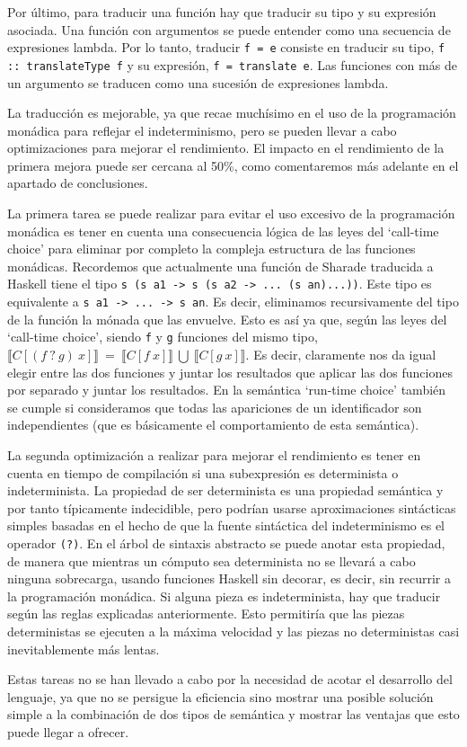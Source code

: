 \documentclass[class=article, crop=false]{standalone}
\begin{document}
Por último, para traducir una función hay que traducir su tipo y su expresión asociada.
Una función con argumentos se puede entender como una secuencia de expresiones lambda. Por
lo tanto, traducir \verb`f = e` consiste en traducir su tipo, \verb`f :: translateType f` y
su expresión, \verb`f = translate e`. Las funciones con más de un argumento se traducen como
una sucesión de expresiones lambda.

La traducción es mejorable, ya que recae muchísimo en el uso de la programación monádica
para reflejar el indeterminismo, pero se pueden llevar a cabo optimizaciones para mejorar
el rendimiento. El impacto en el rendimiento de la primera mejora puede ser cercana al 50\%,
como comentaremos más adelante en el apartado de conclusiones.

La primera tarea se puede realizar para evitar el uso excesivo de la programación monádica
es tener en cuenta una consecuencia lógica de las leyes del `call-time choice' para eliminar
por completo la compleja estructura de las funciones monádicas. Recordemos que actualmente
una función de Sharade traducida a Haskell tiene el tipo
\verb`s (s a1 -> s (s a2 -> ... (s an)...))`. Este tipo es equivalente a
\verb`s a1 -> ... -> s an`. Es decir, eliminamos recursivamente del tipo de la función la
mónada que las envuelve. Esto es así ya que, según las leyes del `call-time choice', siendo
\verb`f` y \verb`g` funciones del mismo tipo, $\llbracket C[(f \: ? \: g) \: x]\rrbracket
\: = \: \llbracket C[f \: x]\rrbracket \: \bigcup \: \llbracket C[g \: x]\rrbracket$. Es
decir, claramente nos da igual elegir entre las dos funciones y juntar los resultados que
aplicar las dos funciones por separado y juntar los resultados. En la semántica
`run-time choice' también se cumple si consideramos que todas las apariciones de un
identificador son  independientes (que es básicamente el comportamiento de esta semántica).

La segunda optimización a realizar para mejorar el rendimiento es tener en cuenta en tiempo
de compilación si una subexpresión es determinista o indeterminista. La propiedad de ser
determinista es una propiedad semántica y por tanto típicamente indecidible, pero podrían
usarse aproximaciones sintácticas simples basadas en el hecho de que la fuente sintáctica
del indeterminismo es el operador \verb`(?)`. En el árbol de sintaxis abstracto se puede
anotar esta propiedad, de manera que mientras un cómputo sea determinista no se llevará a
cabo ninguna sobrecarga, usando funciones Haskell sin decorar, es decir, sin recurrir a la
programación monádica. Si alguna pieza es indeterminista, hay que traducir según las reglas
explicadas anteriormente. Esto permitiría que las piezas deterministas se ejecuten a la
máxima velocidad y las piezas no deterministas casi inevitablemente más lentas.

Estas tareas no se han llevado a cabo por la necesidad de acotar el desarrollo del lenguaje,
ya que no se persigue la eficiencia sino mostrar una posible solución simple a la combinación
de dos tipos de semántica y mostrar las ventajas que esto puede llegar a ofrecer.
\end{document}
